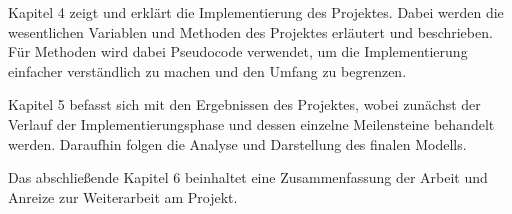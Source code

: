 Kapitel 4 zeigt und erklärt die Implementierung des Projektes. Dabei werden die wesentlichen Variablen und Methoden des Projektes erläutert und beschrieben. Für Methoden wird dabei Pseudocode verwendet, um die Implementierung einfacher verständlich zu machen und den Umfang zu begrenzen.

Kapitel 5 befasst sich mit den Ergebnissen des Projektes, wobei zunächst der Verlauf der Implementierungsphase und dessen einzelne Meilensteine behandelt werden. Daraufhin folgen die Analyse und Darstellung des finalen Modells.

Das abschließende Kapitel 6 beinhaltet eine Zusammenfassung der Arbeit und Anreize zur Weiterarbeit am Projekt.
